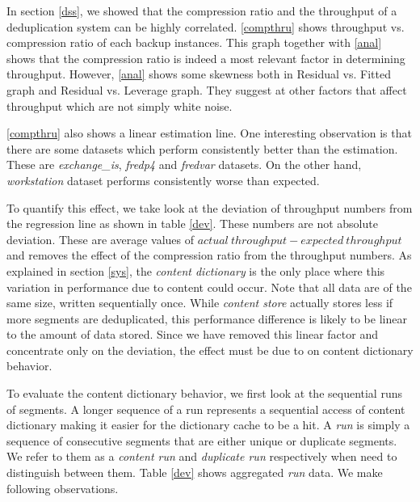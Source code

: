 In section \ref{dss}, we showed that the compression ratio and the throughput of a deduplication system can be highly correlated. \figurename \ref{compthru} shows throughput vs. compression ratio of each backup instances. This graph together with \figurename \ref{anal} shows that the compression ratio is indeed a most relevant factor in determining throughput. However, \figurename \ref{anal} shows some skewness both in Residual vs. Fitted graph and Residual vs. Leverage graph. They suggest at other factors that affect throughput which are not simply white noise. 

\figurename \ref{compthru} also shows a linear estimation line. One interesting observation is that there are some datasets which perform consistently better than the estimation. These are \emph{exchange\_is}, \emph{fredp4} and \emph{fredvar} datasets. On the other hand, \emph{workstation} dataset performs consistently worse than expected. 

To quantify this effect, we take look at the deviation of throughput numbers from the regression line as shown in table \ref{dev}. These numbers are not absolute deviation. These are average values of $actual\ throughput - expected\ throughput$ and removes the effect of the compression ratio from the throughput numbers. As explained in section \ref{sys}, the \emph{content dictionary} is the only place where this variation in performance due to content could occur. Note that all data are of the same size, written sequentially once. While \emph{content store} actually stores less if more segments are deduplicated, this performance difference is likely to be linear to the amount of data stored. Since we have removed this linear factor and concentrate only on the deviation, the effect must be due to on content dictionary behavior.

To evaluate the content dictionary behavior, we first look at the sequential runs of segments. A longer sequence of a run represents a sequential access of content dictionary making it easier for the dictionary cache to be a hit. A \emph{run} is simply a sequence of consecutive segments that are either unique or duplicate segments. We refer to them as a \emph{content run} and \emph{duplicate run} respectively when need to distinguish between them. Table \ref{dev} shows aggregated \emph{run} data. We make following observations.

